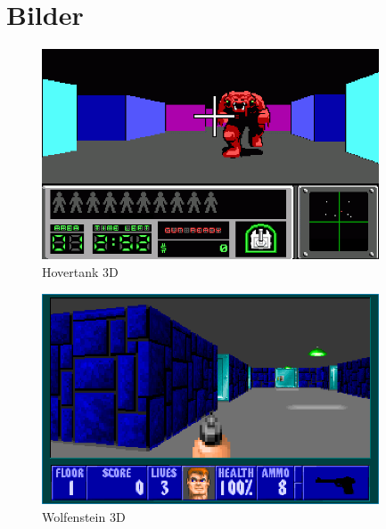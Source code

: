 \documentclass[a4paper,12pt]{report}
\begin{document}
\chapter{Bilder}
\begin{figure}[htbp] 
        \centering
        \includegraphics[width=10cm]{hovertank.png} 
		\caption{Hovertank 3D}
\end{figure}

\begin{figure}[htbp] 
        \centering
        \includegraphics[width=10cm]{wolf3d.png} 
		\caption{Wolfenstein 3D}
\end{figure}
\end{document}
